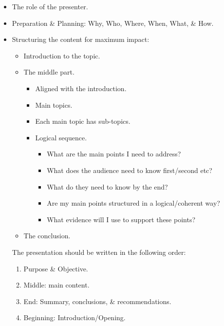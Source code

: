 \documentclass[a4paper]{article}
\begin{document}
\begin{itemize}
    \item   The role of the presenter.
    \item   Preparation \& Planning: Why, Who, Where, When, What, \& How.
    \item   Structuring the content for maximum impact:
            \begin{itemize}
                \item   Introduction to the topic.
                \item   The middle part.
                        \begin{itemize}
                            \item   Aligned with the introduction.
                            \item   Main topics.
                            \item   Each main topic has sub-topics.
                            \item   Logical sequence.
                                    \begin{itemize}
                                        \item   What are the main points I need to address?
                                        \item   What does the audience need to know first/second etc?
                                        \item   What do they need to know by the end?
                                        \item   Are my main points structured in a logical/coherent way?
                                        \item   What evidence will I use to support these points?
                                    \end{itemize}
                        \end{itemize}
                \item   The conclusion.
            \end{itemize}

            The presentation should be written in the following order:
            \begin{enumerate}
                \item   Purpose \& Objective.
                \item   Middle: main content.
                \item   End: Summary, conclusions, \& recommendations.
                \item   Beginning: Introduction/Opening.
            \end{enumerate}


\end{itemize}
\end{document}
